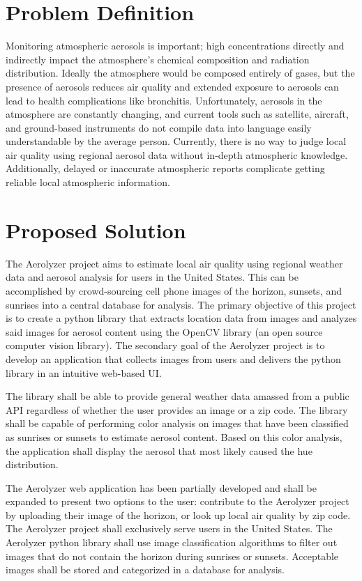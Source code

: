\documentclass[letterpaper,10pt,draftclsnofoot,onecolumn]{IEEEtran}
\begin{document}
\clearpage
\begin{flushleft}
\section{Problem Definition}
Monitoring atmospheric aerosols is important; high concentrations directly and indirectly impact the atmosphere's chemical composition and radiation distribution. Ideally the atmosphere would be composed entirely of gases, but the presence of aerosols reduces air quality and extended exposure to aerosols can lead to health complications like bronchitis. Unfortunately, aerosols in the atmosphere are constantly changing, and current tools such as satellite, aircraft, and ground-based instruments do not compile data into language easily understandable by the average person. Currently, there is no way to judge local air quality using regional aerosol data without in-depth atmospheric knowledge. Additionally, delayed or inaccurate atmospheric reports complicate getting reliable local atmospheric information. 

\section{Proposed Solution}
The Aerolyzer project aims to estimate local air quality using regional weather data and aerosol analysis for users in the United States. This can be accomplished by crowd-sourcing cell phone images of the horizon, sunsets, and sunrises into a central database for analysis. The primary objective of this project is to create a python library that extracts location data from images and analyzes said images for aerosol content using the OpenCV library (an open source computer vision library). The secondary goal of the Aerolyzer project is to develop an application that collects images from users and delivers the python library in an intuitive web-based UI.
\par
The library shall be able to provide general weather data amassed from a public API regardless of whether the user provides an image or a zip code. The library  shall be capable of performing color analysis on images that have been classified as sunrises or sunsets to estimate aerosol content. Based on this color analysis, the application shall display the aerosol that most likely caused the hue distribution.
\par
The Aerolyzer web application has been partially developed and shall be expanded to present two options to the user: contribute to the Aerolyzer project by uploading their image of the horizon, or look up local air quality by zip code. The Aerolyzer project shall exclusively serve users in the United States. The Aerolyzer python library shall use image classification algorithms to filter out images that do not contain the horizon during sunrises or sunsets. Acceptable images shall be stored and categorized in a database for analysis. 


\end{flushleft}
\end{document}
